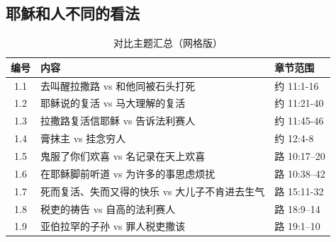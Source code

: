 \subsection{耶穌和人不同的看法}
\begin{table}[htbp]
\centering
\caption{对比主题汇总（网格版）}
\begin{tabular}{c|l|l}\hline
\textbf{编号} & \textbf{内容} & \textbf{章节范围} \\\hline
1.1 & 去叫醒拉撒路 vs 和他同被石头打死 & 约 11:1-16 \\\hline
1.2 & 耶稣说的复活 vs 马大理解的复活 & 约 11:21-40 \\\hline
1.3 & 拉撒路复活信耶稣 vs 告诉法利赛人 & 约 11:45-46 \\\hline
1.4 & 膏抹主 vs 挂念穷人 & 约 12:4-8 \\\hline
1.5 & 鬼服了你们欢喜 vs 名记录在天上欢喜 & 路 10:17--20 \\\hline
1.6 & 在耶稣脚前听道 vs 为许多的事思虑烦扰 & 路 10:38--42 \\\hline
1.7 & 死而复活、失而又得的快乐 vs 大儿子不肯进去生气 & 路 15:11-32 \\\hline
1.8 & 税吏的祷告 vs 自高的法利赛人 & 路 18:9--14 \\\hline
1.9 & 亚伯拉罕的子孙 vs 罪人税吏撒该 & 路 19:1--10 \\\hline
\end{tabular}
\end{table}





